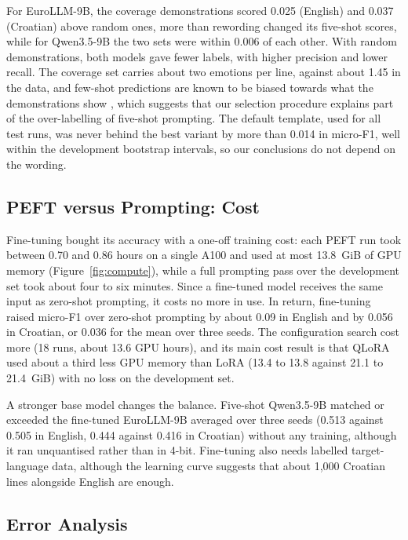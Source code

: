 For EuroLLM-9B, the coverage demonstrations scored 0.025 (English) and 0.037 (Croatian) above random ones, more than rewording changed its five-shot scores, while for Qwen3.5-9B the two sets were within 0.006 of each other. With random demonstrations, both models gave fewer labels, with higher precision and lower recall. The coverage set carries about two emotions per line, against about 1.45 in the data, and few-shot predictions are known to be biased towards what the demonstrations show \parencite{zhao2021calibrate}, which suggests that our selection procedure explains part of the over-labelling of five-shot prompting. The default template, used for all test runs, was never behind the best variant by more than 0.014 in micro-F1, well within the development bootstrap intervals, so our conclusions do not depend on the wording.

\subsection{PEFT versus Prompting: Cost}
\label{sec:analysis_cost}

Fine-tuning bought its accuracy with a one-off training cost: each PEFT run took between 0.70 and 0.86 hours on a single A100 and used at most 13.8~GiB of GPU memory (Figure~\ref{fig:compute}), while a full prompting pass over the development set took about four to six minutes. Since a fine-tuned model receives the same input as zero-shot prompting, it costs no more in use. In return, fine-tuning raised micro-F1 over zero-shot prompting by about 0.09 in English and by 0.056 in Croatian, or 0.036 for the mean over three seeds. The configuration search cost more (18 runs, about 13.6 GPU hours), and its main cost result is that QLoRA used about a third less GPU memory than LoRA (13.4 to 13.8 against 21.1 to 21.4~GiB) with no loss on the development set.

A stronger base model changes the balance. Five-shot Qwen3.5-9B matched or exceeded the fine-tuned EuroLLM-9B averaged over three seeds (0.513 against 0.505 in English, 0.444 against 0.416 in Croatian) without any training, although it ran unquantised rather than in 4-bit. Fine-tuning also needs labelled target-language data, although the learning curve suggests that about 1,000 Croatian lines alongside English are enough.

\subsection{Error Analysis}
\label{sec:analysis_error}

